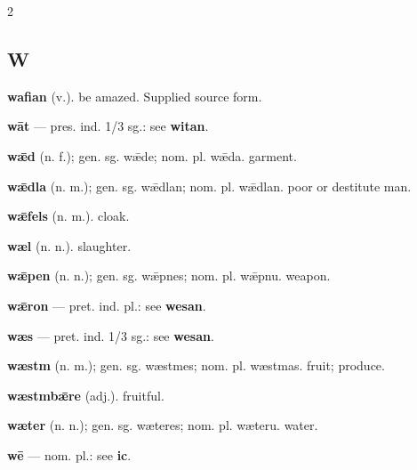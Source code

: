 \begin{multicols*}{2}
\subsection*{W}
\textbf{wafian} (v.). be amazed. Supplied source form.\par
\textbf{wāt} — pres. ind. 1/3 sg.: see \textbf{witan}.\par
\textbf{wǣd} (n. f.); gen. sg. wǣde; nom. pl. wǣda. garment.\par
\textbf{wǣdla} (n. m.); gen. sg. wǣdlan; nom. pl. wǣdlan. poor or destitute man.\par
\textbf{wǣfels} (n. m.). cloak.\par
\textbf{wæl} (n. n.). slaughter.\par
\textbf{wǣpen} (n. n.); gen. sg. wǣpnes; nom. pl. wǣpnu. weapon.\par
\textbf{wǣron} — pret. ind. pl.: see \textbf{wesan}.\par
\textbf{wæs} — pret. ind. 1/3 sg.: see \textbf{wesan}.\par
\textbf{wæstm} (n. m.); gen. sg. wæstmes; nom. pl. wæstmas. fruit; produce.\par
\textbf{wæstmbǣre} (adj.). fruitful.\par
\textbf{wæter} (n. n.); gen. sg. wæteres; nom. pl. wæteru. water.\par
\textbf{wē} — nom. pl.: see \textbf{ic}.\par

\end{multicols*}
